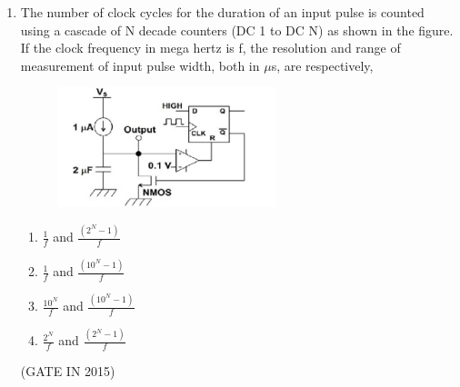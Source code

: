 \documentclass[journal]{IEEEtran}
\begin{document}
\begin{enumerate}
\item The number of clock cycles for the duration of an input pulse is counted using a cascade of N decade counters (DC 1 to DC N) as shown in the figure. If the clock frequency in mega hertz is f, the resolution and range of measurement of input pulse width, both in $\mu$s, are respectively,
\begin{figure}[H]
    \centering
      \includegraphics[width=0.6\textwidth]{24.png} 
      \caption{}
    \label{fig:fig24} 
\end{figure}
\begin{multicols}{4}
\begin{enumerate}
\item $\frac{1}{f}$ and $\frac{(2^N - 1)}{f}$
\item $\frac{1}{f}$ and $\frac{(10^N - 1)}{f}$
\item $\frac{10^N}{f}$ and $\frac{(10^N - 1)}{f}$
\item $\frac{2^N}{f}$ and $\frac{(2^N - 1)}{f}$
\end{enumerate}
  \end{multicols} \hfill(GATE IN 2015)


\end{enumerate}
\end{document}
